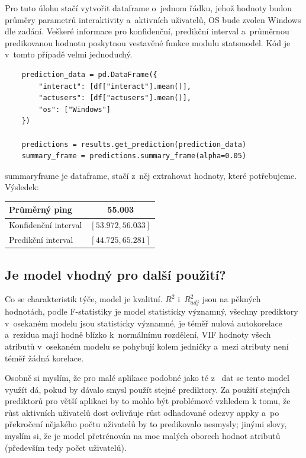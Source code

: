 \documentclass[a4paper, 11pt]{article}
\renewcommand{\texttt}[1]{{\footnotesize\ttfamily #1}}
\begin{document}
Pro tuto úlohu stačí vytvořit dataframe o~jednom řádku, jehož hodnoty budou průměry parametrů interaktivity a~aktivních uživatelů, OS bude zvolen Windows dle zadání.
Veškeré informace pro konfidenční, predikční interval a~průměrnou predikovanou hodnotu poskytnou vestavěné funkce modulu \texttt{statsmodel}.
Kód je v~tomto případě velmi jednoduchý.
\begin{verbatim}
    prediction_data = pd.DataFrame({
        "interact": [df["interact"].mean()],
        "actusers": [df["actusers"].mean()],
        "os": ["Windows"]
    })

    predictions = results.get_prediction(prediction_data)
    summary_frame = predictions.summary_frame(alpha=0.05)
\end{verbatim}
\texttt{summary\textunderscore frame} je dataframe, stačí z~něj extrahovat hodnoty, které potřebujeme.
Výsledek:
\begin{table}[ht]
    \centering
    \begin{tabularx}{0.5\textwidth}{|X|C|}
        \hline
        Průměrný ping & 55.003 \\ 
        \hline
        Konfidenční interval & $[53.972, 56.033]$ \\
        \hline
        Predikční interval & $[44.725, 65.281]$\\
        \hline
    \end{tabularx}
\end{table}

\subsection{Je model vhodný pro další použití?}

Co se charakteristik týče, model je kvalitní.
$R^2$ i~$R^2_{adj}$ jsou na pěkných hodnotách, podle F-statistiky je model statisticky významný, všechny prediktory v~osekaném modelu jsou statisticky významné, je téměř nulová autokorelace a~rezidua mají hodně blízko k~normálnímu rozdělení, VIF hodnoty všech atributů v~osekaném modelu se pohybují kolem jedničky a~mezi atributy není téměř žádná korelace. 

Osobně si myslím, že pro malé aplikace podobné jako té z~ dat se tento model využít dá, pokud by dávalo smysl použít stejné prediktory.
Za použití stejných prediktorů pro větší aplikaci by to mohlo být problémové vzhledem k tomu, že růst aktivních uživatelů dost ovlivňuje růst odhadované odezvy appky a~po překročení nějakého počtu uživatelů by to predikovalo nesmysly; jinými slovy, myslím si, že je model přetrénován na moc malých oborech hodnot atributů (především tedy počet uživatelů).
\end{document}
